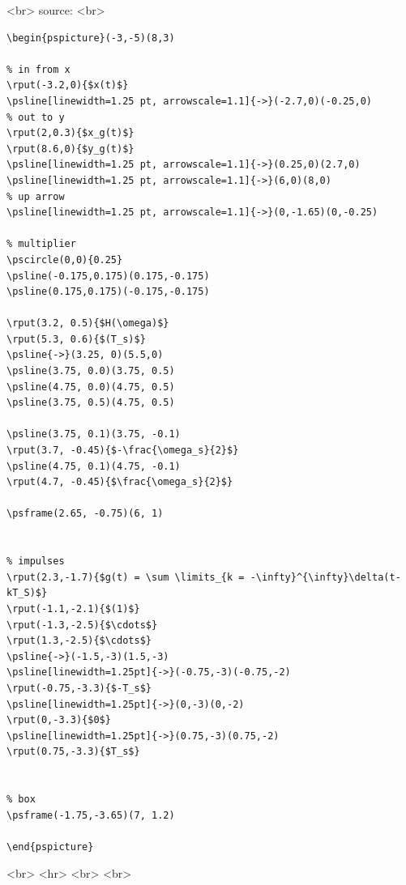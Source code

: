 <br>
source:
<br>
\begin{verbatim}
\begin{pspicture}(-3,-5)(8,3)

% in from x
\rput(-3.2,0){$x(t)$}
\psline[linewidth=1.25 pt, arrowscale=1.1]{->}(-2.7,0)(-0.25,0)
% out to y
\rput(2,0.3){$x_g(t)$}
\rput(8.6,0){$y_g(t)$}
\psline[linewidth=1.25 pt, arrowscale=1.1]{->}(0.25,0)(2.7,0)
\psline[linewidth=1.25 pt, arrowscale=1.1]{->}(6,0)(8,0)
% up arrow
\psline[linewidth=1.25 pt, arrowscale=1.1]{->}(0,-1.65)(0,-0.25)

% multiplier
\pscircle(0,0){0.25}
\psline(-0.175,0.175)(0.175,-0.175)
\psline(0.175,0.175)(-0.175,-0.175)

\rput(3.2, 0.5){$H(\omega)$}
\rput(5.3, 0.6){$(T_s)$}
\psline{->}(3.25, 0)(5.5,0)
\psline(3.75, 0.0)(3.75, 0.5)
\psline(4.75, 0.0)(4.75, 0.5)
\psline(3.75, 0.5)(4.75, 0.5)

\psline(3.75, 0.1)(3.75, -0.1)
\rput(3.7, -0.45){$-\frac{\omega_s}{2}$}
\psline(4.75, 0.1)(4.75, -0.1)
\rput(4.7, -0.45){$\frac{\omega_s}{2}$}

\psframe(2.65, -0.75)(6, 1)


% impulses
\rput(2.3,-1.7){$g(t) = \sum \limits_{k = -\infty}^{\infty}\delta(t-kT_S)$}
\rput(-1.1,-2.1){$(1)$}
\rput(-1.3,-2.5){$\cdots$}
\rput(1.3,-2.5){$\cdots$}
\psline{->}(-1.5,-3)(1.5,-3)
\psline[linewidth=1.25pt]{->}(-0.75,-3)(-0.75,-2)
\rput(-0.75,-3.3){$-T_s$}
\psline[linewidth=1.25pt]{->}(0,-3)(0,-2)
\rput(0,-3.3){$0$}
\psline[linewidth=1.25pt]{->}(0.75,-3)(0.75,-2)
\rput(0.75,-3.3){$T_s$}


% box
\psframe(-1.75,-3.65)(7, 1.2)

\end{pspicture}

\end{verbatim}
<br>
<hr>
<br>
<br>
